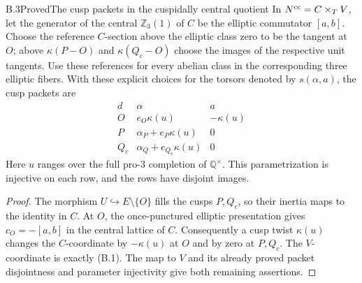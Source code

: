 \begin{statement}{B.3}{Proved}{The cusp packets in the cuspidally central quotient}
In $N^{\rm cc}=C\times_TV$, let the generator of the central
$\mathbb Z_3(1)$ of $C$ be the elliptic commutator $[a,b]$.
Choose the reference $C$-section above the elliptic class zero
to be the tangent at $O$; above $\kappa(P-O)$ and
$\kappa(Q_c-O)$ choose the images of the respective unit tangents.
Use these references for every abelian class in the corresponding
three elliptic fibers.  With these explicit choices for the
torsors denoted by $s(\alpha,a)$, the cusp packets are
\[
 \begin{array}{c|c|c}
 d&\alpha&a\\ \hline
 O&e_O\kappa(u)&-\kappa(u)\\
 P&\alpha_P+e_P\kappa(u)&0\\
 Q_c&\alpha_Q+e_{Q_c}\kappa(u)&0
 \end{array}                                                \tag{B.6}
\]
Here $u$ ranges over the full pro-$3$ completion of
$\mathbb Q^\times$.  This parametrization is injective on each
row, and the rows have disjoint images.
\end{statement}
\begin{proof}
The morphism $U\hookrightarrow E\setminus\{O\}$ fills the cusps
$P,Q_c$, so their inertia maps to the identity in $C$.  At $O$,
the once-punctured elliptic presentation gives
$c_O=-[a,b]$ in the central lattice of $C$.
Consequently a cusp twist $\kappa(u)$ changes the $C$-coordinate
by $-\kappa(u)$ at $O$ and by zero at $P,Q_c$.
The $V$-coordinate is exactly (B.1).
The map to $V$ and its already proved packet disjointness and
parameter injectivity give both remaining assertions.
\end{proof}

